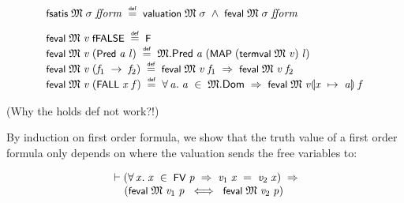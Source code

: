 \documentclass[letterpaper]{article}
\renewcommand{\HOLConst}[1]{{\textsf{\upshape\small #1}}}
\newenvironment{holmath}{\begin{displaymath}\begin{array}{l}}{\end{array}\end{displaymath}\ignorespacesafterend}
\begin{document}
\begin{holmath}
  \HOLConst{fsatis}\;\HOLFreeVar{\ensuremath{\mathfrak{M}}}\;\HOLFreeVar{\ensuremath{\sigma}}\;\HOLFreeVar{fform}\;\HOLSymConst{\HOLTokenDefEquality{}}\;\HOLConst{valuation}\;\HOLFreeVar{\ensuremath{\mathfrak{M}}}\;\HOLFreeVar{\ensuremath{\sigma}}\;\HOLSymConst{\HOLTokenConj{}}\;\HOLConst{feval}\;\HOLFreeVar{\ensuremath{\mathfrak{M}}}\;\HOLFreeVar{\ensuremath{\sigma}}\;\HOLFreeVar{fform}\\[3mm]
  \HOLConst{feval}\;\HOLFreeVar{\ensuremath{\mathfrak{M}}}\;\HOLFreeVar{v}\;\HOLConst{fFALSE}\;\HOLSymConst{\HOLTokenDefEquality{}}\;\HOLConst{F}\\
\HOLConst{feval}\;\HOLFreeVar{\ensuremath{\mathfrak{M}}}\;\HOLFreeVar{v}\;(\HOLConst{Pred}\;\HOLFreeVar{a}\;\HOLFreeVar{l})\;\HOLSymConst{\HOLTokenDefEquality{}}\;\HOLFreeVar{\ensuremath{\mathfrak{M}}}.\HOLFieldName{Pred}\;\HOLFreeVar{a}\;(\HOLConst{MAP}\;(\HOLConst{termval}\;\HOLFreeVar{\ensuremath{\mathfrak{M}}}\;\HOLFreeVar{v})\;\HOLFreeVar{l})\\
\HOLConst{feval}\;\HOLFreeVar{\ensuremath{\mathfrak{M}}}\;\HOLFreeVar{v}\;(\HOLFreeVar{f\sb{\mathrm{1}}}\;\HOLSymConst{\ensuremath{\rightarrow}}\;\HOLFreeVar{f\sb{\mathrm{2}}})\;\HOLSymConst{\HOLTokenDefEquality{}}\;\HOLConst{feval}\;\HOLFreeVar{\ensuremath{\mathfrak{M}}}\;\HOLFreeVar{v}\;\HOLFreeVar{f\sb{\mathrm{1}}}\;\HOLSymConst{\HOLTokenImp{}}\;\HOLConst{feval}\;\HOLFreeVar{\ensuremath{\mathfrak{M}}}\;\HOLFreeVar{v}\;\HOLFreeVar{f\sb{\mathrm{2}}}\\
\HOLConst{feval}\;\HOLFreeVar{\ensuremath{\mathfrak{M}}}\;\HOLFreeVar{v}\;(\HOLConst{FALL}\;\HOLFreeVar{x}\;\HOLFreeVar{f})\;\HOLSymConst{\HOLTokenDefEquality{}}\;\HOLSymConst{\HOLTokenForall{}}\HOLBoundVar{a}.\;\HOLBoundVar{a}\;\HOLSymConst{\HOLTokenIn{}}\;\HOLFreeVar{\ensuremath{\mathfrak{M}}}.\HOLFieldName{Dom}\;\HOLSymConst{\HOLTokenImp{}}\;\HOLConst{feval}\;\HOLFreeVar{\ensuremath{\mathfrak{M}}}\;\HOLFreeVar{v}\ensuremath{\llparenthesis}\HOLFreeVar{x}\;\ensuremath{\mapsto}\;\HOLBoundVar{a}\ensuremath{\rrparenthesis}\;\HOLFreeVar{f}\\
\end{holmath}

 (Why the holds def not work?!)

By induction on first order formula, we show that the truth value of a first order formula only depends on where the valuation sends the free variables to:

\begin{holmath}
  \ensuremath{\HOLTokenTurnstile}(\HOLSymConst{\HOLTokenForall{}}\HOLBoundVar{x}.\;\HOLBoundVar{x}\;\HOLSymConst{\HOLTokenIn{}}\;\HOLConst{FV}\;\HOLFreeVar{p}\;\HOLSymConst{\HOLTokenImp{}}\;\HOLFreeVar{v\sb{\mathrm{1}}}\;\HOLBoundVar{x}\;\HOLSymConst{=}\;\HOLFreeVar{v\sb{\mathrm{2}}}\;\HOLBoundVar{x})\;\HOLSymConst{\HOLTokenImp{}}\\
\;\;\;\;\;(\HOLConst{feval}\;\HOLFreeVar{\ensuremath{\mathfrak{M}}}\;\HOLFreeVar{v\sb{\mathrm{1}}}\;\HOLFreeVar{p}\;\HOLSymConst{\HOLTokenEquiv{}}\;\HOLConst{feval}\;\HOLFreeVar{\ensuremath{\mathfrak{M}}}\;\HOLFreeVar{v\sb{\mathrm{2}}}\;\HOLFreeVar{p})
\end{holmath}
\end{document}
